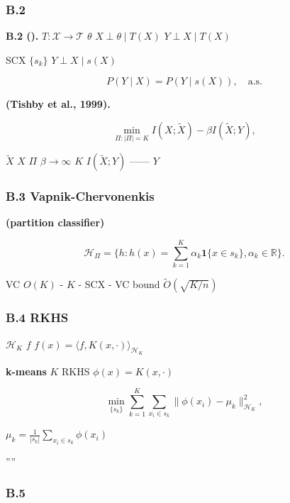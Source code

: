 \documentclass[
  12pt,
]{article}
\begin{document}
\subsubsection{B.2
}\label{b.2-ux5145ux5206ux7edfux8ba1ux91cfux4e0eux4fe1ux606fux74f6ux9888}

\textbf{ B.2 ().} 
\(T: \mathcal{X} \to \mathcal{T}\)  \(\theta\) 
\(X \perp \theta \mid T(X)\) \(Y \perp X \mid T(X)\)


SCX  \(\{s_k\}\) \textbf{}
\(Y \perp X \mid s(X)\)

\[P(Y \mid X) = P(Y \mid s(X)), \quad \text{a.s.}\]

\textbf{ (Tishby et al., 1999).}


\[\min_{\Pi: |\Pi| = K} I(X; \tilde{X}) - \beta I(\tilde{X}; Y),\]

 \(\tilde{X}\)  \(X\)  \(\Pi\) 
\(\beta \to \infty\)  \(K\)  \(I(\tilde{X}; Y)\)
------ \(Y\) 

\subsubsection{B.3  Vapnik-Chervonenkis
}\label{b.3-ux4e0e-vapnik-chervonenkis-ux7406ux8bbaux7684ux8054ux7cfb}

\textbf{ (partition classifier)}

\[\mathcal{H}_\Pi = \{h: h(x) = \sum_{k=1}^K \alpha_k \mathbf{1}\{x \in s_k\}, \alpha_k \in \mathbb{R}\}.\]

 VC  \(O(K)\) -  \(K\)
 - SCX
\textbf{}\textbf{}
-  VC bound \(\tilde{O}(\sqrt{K/n})\)

\subsubsection{B.4  RKHS
}\label{b.4-ux4e0e-rkhs-ux7684ux5173ux7cfb}

 \(\mathcal{H}_K\)  \(f\) 
\(f(x) = \langle f, K(x, \cdot) \rangle_{\mathcal{H}_K}\)

\textbf{ k-means } \(K\) RKHS 
\(\phi(x) = K(x, \cdot)\) 

\[\min_{\{s_k\}} \sum_{k=1}^K \sum_{x_i \in s_k} \|\phi(x_i) - \mu_k\|_{\mathcal{H}_K}^2,\]

 \(\mu_k = \frac{1}{|s_k|} \sum_{x_i \in s_k} \phi(x_i)\)

''''

\subsubsection{B.5
}\label{b.5-ux4e0eux6d41ux5f62ux5b66ux4e60ux548cux8c31ux805aux7c7bux7684ux5173ux7cfb}
\end{document}

